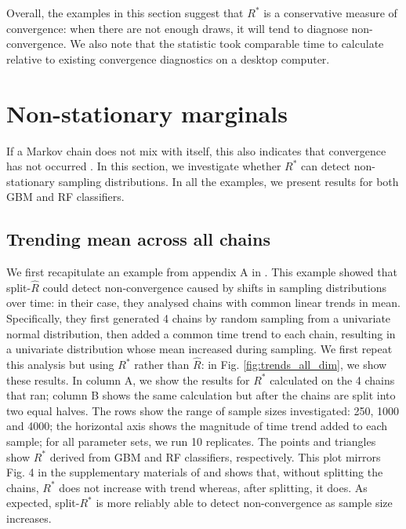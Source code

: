 \documentclass[ba]{imsart}
\numberwithin{equation}{section}
\theoremstyle{plain}
\begin{document}
\begin{supplement}
		Overall, the examples in this section suggest that $R^*$ is a conservative measure of convergence: when there are not enough draws, it will tend to diagnose non-convergence. We also note that the statistic took comparable time to calculate relative to existing convergence diagnostics on a desktop computer.
		
		\section{Non-stationary marginals}\label{sec:non-stationary}
		If a Markov chain does not mix with itself, this also indicates that convergence has not occurred \citep{gelman2013bayesian}. In this section, we investigate whether $R^*$ can detect non-stationary sampling distributions. In all the examples, we present results for both GBM and RF classifiers.
		
		\subsection{Trending mean across all chains}\label{sec:non-stationary_chains}
		We first recapitulate an example from appendix A in \cite{vehtari2019rank}. This example showed that split-$\widehat{R}$ could detect non-convergence caused by shifts in sampling distributions over time: in their case, they analysed chains with common linear trends in mean. Specifically, they first generated 4 chains by random sampling from a univariate normal distribution, then added a common time trend to each chain, resulting in a univariate distribution whose mean increased during sampling. We first repeat this analysis but using $R^*$ rather than $\widehat{R}$: in Fig. \ref{fig:trends_all_dim}, we show these results. In column A, we show the results for $R^*$ calculated on the 4 chains that ran; column B shows the same calculation but after the chains are split into two equal halves. The rows show the range of sample sizes investigated: 250, 1000 and 4000; the horizontal axis shows the magnitude of time trend added to each sample; for all parameter sets, we run 10 replicates. The points and triangles show $R^*$ derived from GBM and RF classifiers, respectively. This plot mirrors Fig. 4 in the supplementary materials of \cite{vehtari2019rank} and shows that, without splitting the chains, $R^*$ does not increase with trend whereas, after splitting, it does. As expected, split-$R^*$ is more reliably able to detect non-convergence as sample size increases.
		

\end{supplement}
\end{document}
